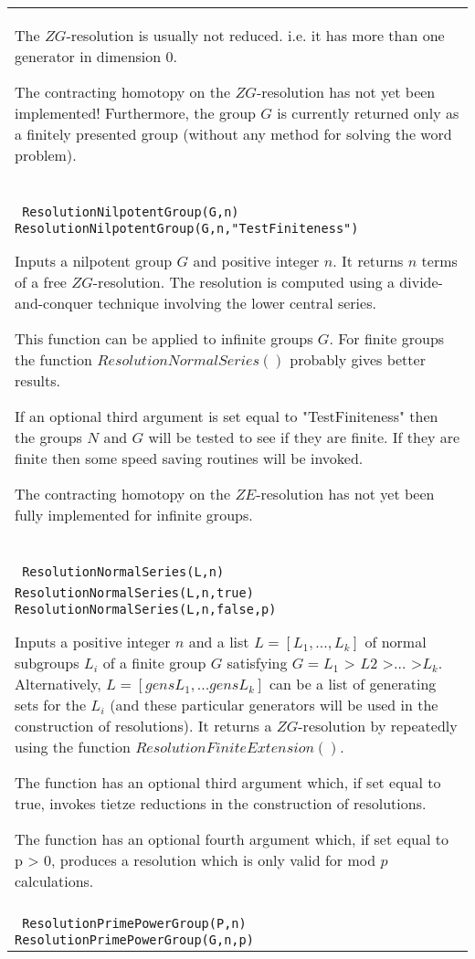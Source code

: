 \documentclass[a4paper,11pt]{report}
\begin{document}
{\begin{center}
\begin{tabular}{|l|}
 The $ZG$-resolution is usually not reduced. i.e. it has more than one generator in
dimension 0.

 The contracting homotopy on the $ZG$-resolution has not yet been implemented! Furthermore, the group $G$ is currently returned only as a finitely presented group (without any method
for solving the word problem). \\
 \index{ResolutionNilpotentGroup} \texttt{ ResolutionNilpotentGroup(G,n) } {\nobreakspace} \texttt{ ResolutionNilpotentGroup(G,n,"TestFiniteness")} 

 Inputs a nilpotent group $G$ and positive integer $n$. It returns $n$ terms of a free $ZG$-resolution. The resolution is computed using a divide-and-conquer technique
involving the lower central series.

 This function can be applied to infinite groups $G$. For finite groups the function $ResolutionNormalSeries()$ probably gives better results.

 If an optional third argument is set equal to "TestFiniteness" then the groups $N$ and $G$ will be tested to see if they are finite. If they are finite then some speed
saving routines will be invoked.

 The contracting homotopy on the $ZE$-resolution has not yet been fully implemented for infinite groups. \\
 \index{ResolutionNormalSeries} \texttt{ ResolutionNormalSeries(L,n) } {\nobreakspace} \texttt{ ResolutionNormalSeries(L,n,true)} {\nobreakspace} \texttt{ ResolutionNormalSeries(L,n,false,p)} 

 Inputs a positive integer $n$ and a list $L = [L_1 , ..., L_k]$ of normal subgroups $L_i$ of a finite group $G$ satisfying $G = L_1$ {\textgreater} $L2$ {\textgreater}$ \ldots $ {\textgreater}$ L_k$. Alternatively, $L = [gensL_1, ... gensL_k]$ can be a list of generating sets for the $L_i$ (and these particular generators will be used in the construction of
resolutions). It returns a $ZG$-resolution by repeatedly using the function $ResolutionFiniteExtension()$.

 The function has an optional third argument which, if set equal to true,
invokes tietze reductions in the construction of resolutions.

 The function has an optional fourth argument which, if set equal to p
{\textgreater} 0, produces a resolution which is only valid for mod $p$ calculations. \\
 \index{ResolutionPrimePowerGroup} \texttt{ ResolutionPrimePowerGroup(P,n) } {\nobreakspace} \texttt{ ResolutionPrimePowerGroup(G,n,p)} 


\end{tabular}
\end{center}}
\end{document}
